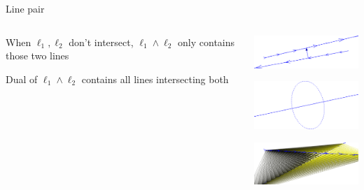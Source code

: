 \documentclass{beamer}
\begin{document}
\begin{frame}{Line pair}
  \begin{columns}
    \begin{column}{5cm}
      When $\ell_1, \ell_2$ don't intersect, $\ell_1 \wedge \ell_2$ only contains those two lines

      \bigskip

      Dual of $\ell_1 \wedge \ell_2$ contains all lines intersecting both 
    \end{column}
    \begin{column}{5cm}
      \begin{center}
        \includegraphics[width=5cm]{linepair1}

        \includegraphics[width=5cm]{linepair2}

        \includegraphics[width=5cm]{linepair3}
      \end{center}
    \end{column}
  \end{columns}
\end{frame}
\end{document}
